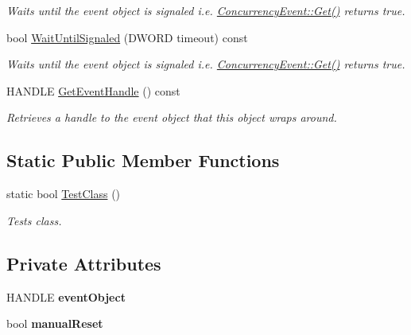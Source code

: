 \begin{DoxyCompactItemize}
\begin{DoxyCompactList}\small\item\em Waits until the event object is signaled i.e. \hyperlink{class_concurrency_event_aadb3a5e0b14aff16cc6a2a953d66537f}{ConcurrencyEvent::Get()} returns true. \item\end{DoxyCompactList}\item 
bool \hyperlink{class_concurrency_event_a1080a3f2fe5f81ce3dcd0ee9d25c7e86}{WaitUntilSignaled} (DWORD timeout) const 
\begin{DoxyCompactList}\small\item\em Waits until the event object is signaled i.e. \hyperlink{class_concurrency_event_aadb3a5e0b14aff16cc6a2a953d66537f}{ConcurrencyEvent::Get()} returns true. \item\end{DoxyCompactList}\item 
HANDLE \hyperlink{class_concurrency_event_a039e132dd01655976f07f281fd71a5c7}{GetEventHandle} () const 
\begin{DoxyCompactList}\small\item\em Retrieves a handle to the event object that this object wraps around. \item\end{DoxyCompactList}\end{DoxyCompactItemize}
\subsection*{Static Public Member Functions}
\begin{DoxyCompactItemize}
\item 
static bool \hyperlink{class_concurrency_event_a37012ea841cbd181c60861240ca21091}{TestClass} ()
\begin{DoxyCompactList}\small\item\em Tests class. \item\end{DoxyCompactList}\end{DoxyCompactItemize}
\subsection*{Private Attributes}
\begin{DoxyCompactItemize}
\item 
\hypertarget{class_concurrency_event_a2e3100a49fccb1312d1d879d658781df}{
HANDLE {\bfseries eventObject}}
\label{class_concurrency_event_a2e3100a49fccb1312d1d879d658781df}

\item 
\hypertarget{class_concurrency_event_a0b5377757018d5404e850df2435d4173}{
bool {\bfseries manualReset}}
\label{class_concurrency_event_a0b5377757018d5404e850df2435d4173}

\end{DoxyCompactItemize}


